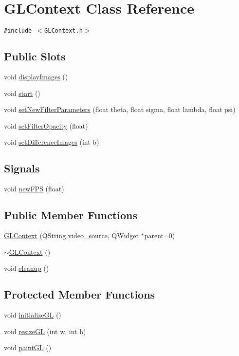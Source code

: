 \hypertarget{classGLContext}{
\section{GLContext Class Reference}
\label{classGLContext}
}
{\tt \#include $<$GLContext.h$>$}

\subsection*{Public Slots}
\begin{CompactItemize}
\item 
void \hyperlink{classGLContext_bc98d2bce284ff629e71a70d43580585}{displayImages} ()
\item 
void \hyperlink{classGLContext_5e59aaa40eef13416aea345fbd3a18d9}{start} ()
\item 
void \hyperlink{classGLContext_dcb0d67f5abe53af20878c897fa645ec}{setNewFilterParameters} (float theta, float sigma, float lambda, float psi)
\item 
void \hyperlink{classGLContext_a70a83ef6631a6348b030302d59c81a1}{setFilterOpacity} (float)
\item 
void \hyperlink{classGLContext_f3f800a58fc12d95d4604de755c7fa57}{setDifferenceImages} (int b)
\end{CompactItemize}
\subsection*{Signals}
\begin{CompactItemize}
\item 
void \hyperlink{classGLContext_aab9d6eeb0adaeab6a194cfeb7b10f3b}{newFPS} (float)
\end{CompactItemize}
\subsection*{Public Member Functions}
\begin{CompactItemize}
\item 
\hyperlink{classGLContext_57fc1d8a0ec1de5a3445c5aa638e1150}{GLContext} (QString video\_\-source, QWidget $\ast$parent=0)
\item 
\hyperlink{classGLContext_ae8b3e070f7f2a9ecf235202f2e330dd}{$\sim$GLContext} ()
\item 
void \hyperlink{classGLContext_df4f504b82483546d470d8361426317b}{cleanup} ()
\end{CompactItemize}
\subsection*{Protected Member Functions}
\begin{CompactItemize}
\item 
void \hyperlink{classGLContext_a890225a087cec830eef8a79c2b3ad6c}{initializeGL} ()
\item 
void \hyperlink{classGLContext_e4ca1fa439790e7f7ea5338000ce5d8b}{resizeGL} (int w, int h)
\item 
void \hyperlink{classGLContext_24e08766dea1888279ffd5499087bc62}{paintGL} ()
\end{CompactItemize}


